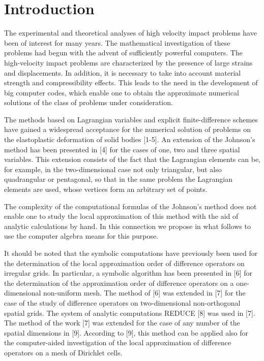 \section{Introduction}
\hspace{1cm}
   The experimental and theoretical analyses of high velocity impact problems
have been of interest for many years. The mathematical investigation of these
problems had begun with the advent of sufficiently powerful computers. The
high-velocity impact problems are characterized by the presence of large
strains and displacements. In addition, it is necessary to take into account
material strength and compressibility effects. This leads to the need in the
development of big computer codes, which enable one to obtain the approximate
numerical solutions of the class of problems under consideration.

   The methods based on Lagrangian variables and explicit finite-difference
schemes have gained a widespread acceptance for the numerical solution of
problems on the elastoplastic deformation of solid bodies [1-5]. An extension
of the Johnson's method has been presented in [4] for the cases of one, two
and three spatial variables. This extension consists of the fact that the
Lagrangian elements can be, for example, in the two-dimensional case not only
triangular, but also quadrangular or pentagonal, so that in the same problem
the Lagrangian elements are used, whose vertices form an arbitrary set of
points.

   The complexity of the computational formulas of the Johnson's method does
not enable one to study the local approximation of this method with the aid of
analytic calculations by hand. In this connection we propose in what follows
to use the computer algebra means for this purpose.

   It should be noted that the symbolic computations have previously been
used for the determination of the local approximation order of difference
operators on irregular grids. In particular, a symbolic algorithm has been
presented in [6] for the determination of the approximation order of
difference operators on a one-dimensional non-uniform mesh. The method of [6]
was extended in [7] for the case of the study of difference operators on
two-dimensional non-orthogonal spatial grids. The system of analytic
computations REDUCE [8] was used in [7]. The method of the work [7] was
extended for the case of any number of the spatial dimensions in [9].
According to [9], this method can be applied also for the computer-aided
investigation of the local approximation of difference operators on a mesh of
Dirichlet cells.

